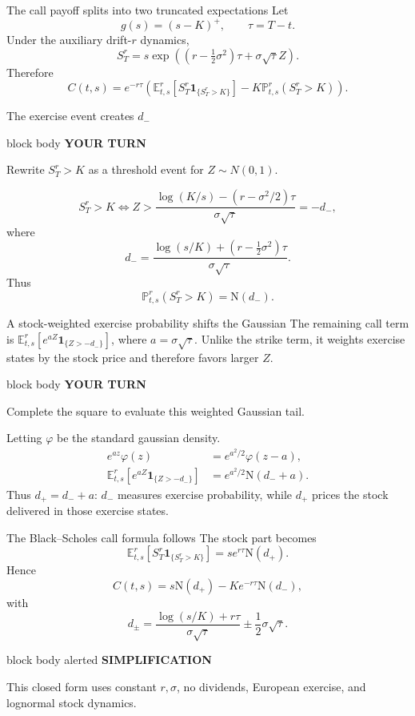 \documentclass[handout,10pt,aspectratio=169]{beamer}
\newenvironment{simplificationbox}{%
  \begin{beamercolorbox}[rounded=true,sep=0.7em,wd=\textwidth]{block body alerted}
  \textbf{\color{CourseRed}SIMPLIFICATION}\quad
}{\end{beamercolorbox}}
\newenvironment{pausebox}{%
  \begin{beamercolorbox}[rounded=true,sep=0.8em,wd=\textwidth]{block body}
  \textbf{\color{CourseGold}YOUR TURN}\quad
}{\end{beamercolorbox}}
\newcommand{\E}{\mathbb E}
\newcommand{\Pp}{\mathbb P}
\newcommand{\Ncdf}{\mathrm N}
\newcommand{\phiN}{\varphi}
\newcommand{\1}{\mathbf 1}
\begin{document}
\begin{frame}{The call payoff splits into two truncated expectations}
Let
\[
g(s)=(s-K)^+,
\qquad \tau=T-t.
\]
Under the auxiliary drift-\(r\) dynamics,
\[
S_T^r
=s\exp\left(
(r-\tfrac12\sigma^2)\tau+\sigma\sqrt{\tau}Z
\right).
\]
Therefore
\[
C(t,s)
=e^{-r\tau}\left(
\E^r_{t,s}[S_T^r\1_{\{S_T^r>K\}}]
-K\Pp^r_{t,s}(S_T^r>K)
\right).
\]
\end{frame}

\begin{frame}{The exercise event creates \(d_-\)}
\begin{pausebox}
Rewrite \(S_T^r>K\) as a threshold event for \(Z\sim N(0,1)\).
\end{pausebox}

\[
S_T^r>K
\iff
Z>
\frac{\log(K/s)-(r-\sigma^2/2)\tau}{\sigma\sqrt{\tau}}
=-d_-,
\]
where
\[
\boxed{
d_-=
\frac{\log(s/K)+(r-\tfrac12\sigma^2)\tau}
{\sigma\sqrt{\tau}}.}
\]
Thus
\[
\boxed{\Pp^r_{t,s}(S_T^r>K)=\Ncdf(d_-).}
\]
\end{frame}

\begin{frame}{A stock-weighted exercise probability shifts the Gaussian}
\small
The remaining call term is
\(\E^r_{t,s}[e^{aZ}\1_{\{Z>-d_-\}}]\), where \(a=\sigma\sqrt{\tau}\).
Unlike the strike term, it weights exercise states by the stock price and
therefore favors larger \(Z\).
\begin{pausebox}
Complete the square to evaluate this weighted Gaussian tail.
\end{pausebox}

Letting $\varphi$ be the standard gaussian density.
\[
\begin{aligned}
e^{az}\phiN(z)&=e^{a^2/2}\phiN(z-a),\\
\E^r_{t,s}[e^{aZ}\1_{\{Z>-d_-\}}]
&=e^{a^2/2}\Ncdf(d_-+a).
\end{aligned}
\]
Thus \(\boxed{d_+=d_-+a}\): \(d_-\) measures exercise probability, while
\(d_+\) prices the stock delivered in those exercise states.
\end{frame}

\begin{frame}{The Black--Scholes call formula follows}
The stock part becomes
\[
\E^r_{t,s}[S_T^r\1_{\{S_T^r>K\}}]
=se^{r\tau}\Ncdf(d_+).
\]
Hence
\[
\boxed{
C(t,s)=s\Ncdf(d_+)-Ke^{-r\tau}\Ncdf(d_-),}
\]
with
\[
\boxed{
d_\pm
=\frac{\log(s/K)+r\tau}{\sigma\sqrt{\tau}}
\pm\frac12\sigma\sqrt{\tau}.}
\]
\begin{simplificationbox}
This closed form uses constant \(r,\sigma\), no dividends, European exercise,
and lognormal stock dynamics.
\end{simplificationbox}
\end{frame}
\end{document}
